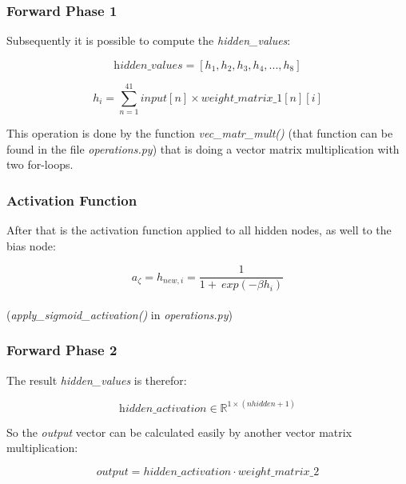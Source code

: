 \documentclass[10pt,a4paper]{article}
\begin{document}
	\subsubsection{Forward Phase 1}
	Subsequently it is possible to compute the \textit{hidden\_values}:
	\begin{center}
		\begin{equation}
		\textit{hidden\_values} = [h_1,h_2,h_3,h_4,...,h_8]
		\end{equation} 
	\end{center}

	\begin{center}
		\begin{equation}
		h_i = \sum_{n=1}^{41} input[n] \times weight\_matrix\_1[n][i] 
		\end{equation} 
	\end{center}
	This operation is done by the function \textit{ vec\_matr\_mult()} (that function can be found in the file \textit{operations.py}) that is doing a vector matrix multiplication with two for-loops. \\
	\subsubsection{Activation Function}
	After that is the activation function applied to all hidden nodes, as well to the bias node:
	\begin{center}
		\begin{equation}
		a_{\zeta} = h_{new, i} = \frac{1}{1 + \ exp(-\beta h_i)} 
		\end{equation} 
		\\ (\textit{apply\_sigmoid\_activation()} in \textit{operations.py})
	\end{center}
	\subsubsection{Forward Phase 2}
	The result \textit{hidden\_values} is therefor: 
	\begin{center}
		\begin{equation}
		\textit{hidden\_activation} \in \mathbb{R}^{1\times (nhidden +1)} 
		\end{equation} 
	\end{center}
	 So the \textit{output} vector can be calculated easily by another vector matrix multiplication:
	  \begin{center}
	  	\begin{equation}
	  	\textit{output} = hidden\_activation \cdot weight\_matrix\_2 
	  	\end{equation} 
	  \end{center}
\end{document}
